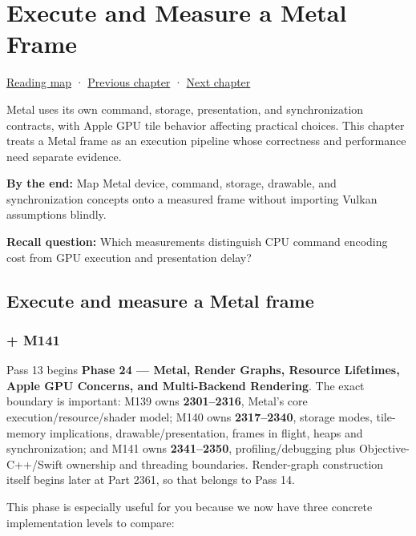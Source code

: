 \hypertarget{01-foundations-i-ch015}{}
\chapter{Execute and Measure a Metal Frame}\label{01-foundations-i-ch015-execute-and-measure-a-metal-frame}

\hyperref[volume-reading-map]{Reading map} · \hyperref[01-foundations-i-ch014-submit-synchronize-and-retire-gpu-work]{Previous chapter} · \hyperref[01-foundations-i-ch016-profile-gpus-and-respect-apple-ownership-boundaries]{Next chapter}

Metal uses its own command, storage, presentation, and synchronization contracts, with Apple GPU tile behavior affecting practical choices. This chapter treats a Metal frame as an execution pipeline whose correctness and performance need separate evidence.

\textbf{By the end:} Map Metal device, command, storage, drawable, and synchronization concepts onto a measured frame without importing Vulkan assumptions blindly.

\textbf{Recall question:} Which measurements distinguish CPU command encoding cost from GPU execution and presentation delay?

\section{Execute and measure a Metal frame}\label{01-foundations-i-ch015-execute-and-measure-a-metal-frame-1}

\subsection{+ M141}\label{01-foundations-i-ch015-m141}

Pass 13 begins \textbf{Phase 24 --- Metal, Render Graphs, Resource Lifetimes, Apple GPU Concerns, and Multi-Backend Rendering}. The exact boundary is important: M139 owns \textbf{2301--2316}, Metal's core execution/resource/shader model; M140 owns \textbf{2317--2340}, storage modes, tile-memory implications, drawable/presentation, frames in flight, heaps and synchronization; and M141 owns \textbf{2341--2350}, profiling/debugging plus Objective-C++/Swift ownership and threading boundaries. Render-graph construction itself begins later at Part 2361, so that belongs to Pass 14.

This phase is especially useful for you because we now have three concrete implementation levels to compare:

